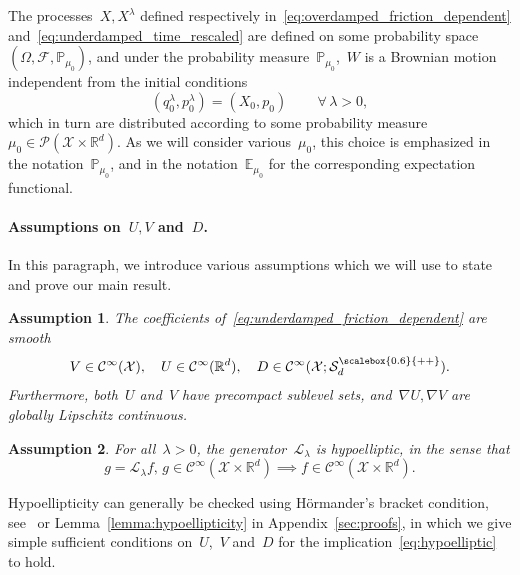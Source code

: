 \documentclass[10pt]{article}
\newcommand{\cL}{\mathcal{L}}
\newcommand{\E}{\mathbb{E}}
\renewcommand{\P}{\mathbb{P}}
\newcommand{\R}{\mathbb{R}}
\newcommand{\cX}{\mathcal{X}}
\newcommand{\cP}{\mathcal{P}}
\newcommand{\cSpd}{\mathcal{S}_d^{\scalebox{0.6}{++}}}
\newcommand{\1}{\mathbbm 1}
\newtheorem{hypothesis}{Assumption}
\begin{document}
The processes~$X,X^\lambda$ defined respectively in~\eqref{eq:overdamped_friction_dependent} and~\eqref{eq:underdamped_time_rescaled} are defined on some probability space~$(\Omega,\mathcal F,\P_{\mu_0})$,
and under the probability measure~$\P_{\mu_0}$,~$W$ is a Brownian motion independent from the initial conditions
\begin{equation}
    \label{eq:initial_conditions}
    (q_0^\lambda,p_0^\lambda)=(X_0,p_0)\,\qquad \forall\,\lambda >0,
\end{equation}
which in turn are distributed according to some probability measure~$\mu_0\in\cP(\cX\times\R^d)$. As we will consider various~$\mu_0$, this choice is emphasized in the notation~$\P_{\mu_0}$, and in the notation~$\E_{\mu_0}$ for the corresponding expectation functional.

\paragraph{Assumptions on~$U,V$ and~$D$.}
In this paragraph, we introduce various assumptions which we will use to state and prove our main result.

\begin{hypothesis}
    \label{hyp:smoothness}
    The coefficients of~\eqref{eq:underdamped_friction_dependent} are smooth
    \begin{equation}
        \label{eq:smoothness}
        V\in\mathcal C^\infty(\cX),\quad U\in\mathcal C^\infty(\R^d),\quad D\in\mathcal C^\infty(\cX;\cSpd).
    \end{equation}
    Furthermore, both~$U$ and~$V$ have precompact sublevel sets, and~$\nabla U,\nabla V$ are globally Lipschitz continuous.
    \end{hypothesis}

\begin{hypothesis}
    \label{hyp:hypoellipticity}
    For all~$\lambda>0$, the generator~$\cL_\lambda$ is hypoelliptic, in the sense that
    \begin{equation}
        \label{eq:hypoelliptic}
        g = \cL_\lambda f,\, g\in \mathcal C^\infty(\cX\times\R^d) \implies f\in \mathcal C^\infty(\cX\times \R^d).
    \end{equation}
\end{hypothesis}
Hypoellipticity can generally be checked using H\"ormander's bracket condition, see~\cite{H67} or Lemma~\ref{lemma:hypoellipticity} in Appendix~\ref{sec:proofs}, in which we give simple sufficient conditions on~$U$,~$V$ and~$D$ for the implication~\eqref{eq:hypoelliptic} to hold.
\end{document}
